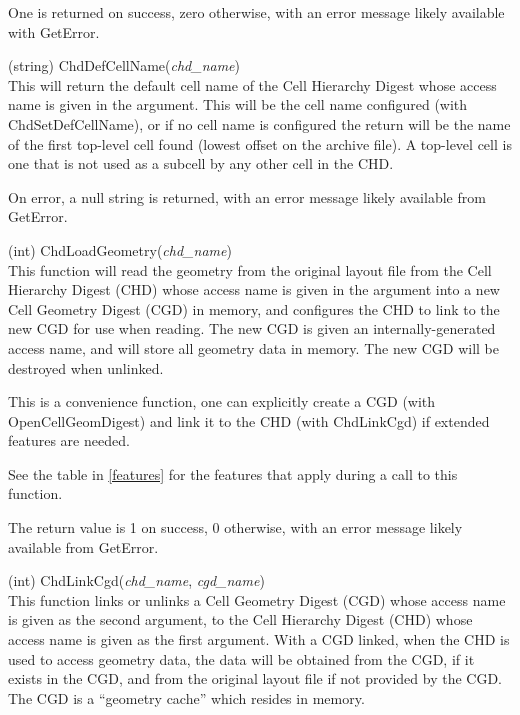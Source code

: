 \begin{description}
One is returned on success, zero otherwise, with an error message
likely available with {\vt GetError}.

\item{(string) \vt ChdDefCellName({\it chd\_name\/})}\\
This will return the default cell name of the Cell Hierarchy Digest
whose access name is given in the argument.  This will be the cell
name configured (with {\vt ChdSetDefCellName}), or if no cell name is
configured the return will be the name of the first top-level cell
found (lowest offset on the archive file).  A top-level cell is one
that is not used as a subcell by any other cell in the CHD.

On error, a null string is returned, with an error message likely
available from {\vt GetError}.

\item{(int) \vt ChdLoadGeometry({\it chd\_name\/})}\\
This function will read the geometry from the original layout file
from the Cell Hierarchy Digest (CHD) whose access name is given in the
argument into a new Cell Geometry Digest (CGD) in memory, and
configures the CHD to link to the new CGD for use when reading.  The
new CGD is given an internally-generated access name, and will store
all geometry data in memory.  The new CGD will be destroyed when
unlinked. 

This is a convenience function, one can explicitly create a CGD   
(with {\vt OpenCellGeomDigest}) and link it to the CHD (with   
{\vt ChdLinkCgd}) if extended features are needed.   

See the table in \ref{features} for the features that apply during a
call to this function.

The return value is 1 on success, 0 otherwise, with an error message
likely available from {\vt GetError}.

\item{(int) \vt ChdLinkCgd({\it chd\_name\/}, {\it cgd\_name\/})}\\
This function links or unlinks a Cell Geometry Digest (CGD) whose
access name is given as the second argument, to the Cell Hierarchy
Digest (CHD) whose access name is given as the first argument.  With a
CGD linked, when the CHD is used to access geometry data, the data
will be obtained from the CGD, if it exists in the CGD, and from the
original layout file if not provided by the CGD.  The CGD is a
``geometry cache'' which resides in memory.


\end{description}
